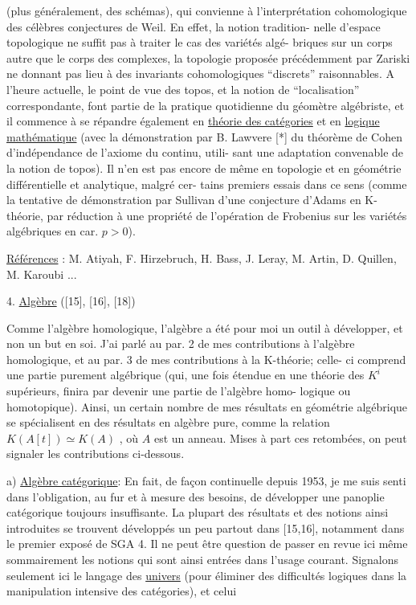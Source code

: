 
(plus généralement, des schémas), qui convienne à l'interprétation
cohomologique des célèbres conjectures de Weil. En effet, la notion tradition-%
nelle d'espace topologique ne suffit pas à traiter le cas des variétés algé-%
briques sur un corps autre que le corps des complexes, la topologie proposée
précédemment par Zariski ne donnant pas lieu à des invariants cohomologiques
``discrets'' raisonnables. A l'heure actuelle, le point de vue des topos, et la
notion de ``localisation'' correspondante, font partie de la pratique quotidienne
du géomètre algébriste, et il commence à se répandre également en
\uline{théorie des catégories} et en \uline{logique mathématique} (avec la démonstration par B.
Lawvere [*] du théorème de Cohen d'indépendance de l'axiome du continu, utili-%
sant une adaptation convenable de la notion de topos). Il n'en est pas encore
de même en topologie et en géométrie différentielle et analytique, malgré cer-%
tains premiers essais dans ce sens (comme la tentative de démonstration par
Sullivan d'une conjecture d'Adams en K-théorie, par réduction à une propriété
de l'opération de Frobenius sur les variétés algébriques en car. $p > 0$).

\uline{Références} : M. Atiyah, F. Hirzebruch, H. Bass, J. Leray, M. Artin, D. Quillen,
M. Karoubi ...

4. \uline{Algèbre} ([15], [16], [18])

Comme l'algèbre homologique, l'algèbre a été pour moi un outil à
développer, et non un but en soi. J'ai parlé au par. 2 de mes contributions à
l'algèbre homologique, et au par. 3 de mes contributions à la K-théorie; celle-%
ci comprend une partie purement algébrique (qui, une fois étendue en une
théorie des $K^{i}$ supérieurs, finira par devenir une partie de l'algèbre homo-%
logique ou homotopique). Ainsi, un certain nombre de mes résultats en géométrie
algébrique se spécialisent en des résultats en algèbre pure, comme la relation
$K(A[t]) \simeq K(A)$ , où $A$ est un anneau. Mises à part ces retombées, on peut
signaler les contributions ci-dessous.

a) \uline{Algèbre catégorique}: En fait, de façon continuelle depuis 1953, je me suis
senti dans l'obligation, au fur et à mesure des besoins, de développer une
panoplie catégorique toujours insuffisante. La plupart des résultats et des
notions ainsi introduites se trouvent développés un peu partout dans [15,16],
notamment dans le premier exposé de SGA 4. Il ne peut être question de passer
en revue ici même sommairement les notions qui sont ainsi entrées dans l'usage
courant. Signalons seulement ici le langage des \uline{univers} (pour éliminer des
difficultés logiques dans la manipulation intensive des catégories), et celui

